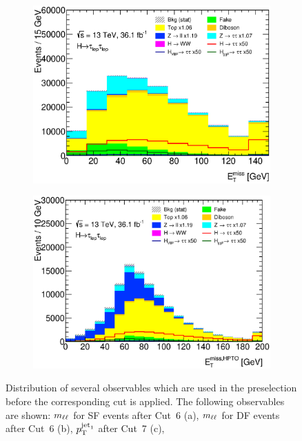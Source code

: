 \begin{figure}[htb]
\begin{subfigure}[t]{0.45\textwidth}
        \includegraphics[width=\textwidth]{./plots/event_selection/presel/emme-CutJet0Pt-MET-lin.eps}
        \caption{}\label{fig:event_selection:cutflow:metdf}
    \end{subfigure}
    \begin{subfigure}[t]{0.45\textwidth}
        \includegraphics[width=\textwidth]{./plots/event_selection/presel/eemm-CutMET-METhpto-lin.eps}
        \caption{}\label{fig:event_selection:cutflow:hpto}
    \end{subfigure}
    \caption{Distribution of several observables which are used in the preselection before the corresponding cut is applied.
             The following observables are shown: $m_{\ell\ell}$ for SF events after Cut~6 (a), $m_{\ell\ell}$ for DF events after Cut~6 (b), $p_\text{T}^{\text{jet}_1}$ after Cut~7 (c),
}
\end{figure}

